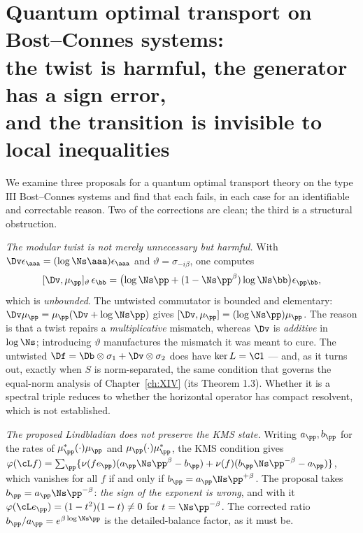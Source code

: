 \chapter[Twists, detailed balance, and tensorisation]{Quantum optimal transport on Bost--Connes systems:\\ the twist is harmful, the generator has a sign error,\\ and the transition is invisible to local inequalities}\label{ch:XVI}
\begin{summary}
We examine three proposals for a quantum optimal transport theory on the type $\mathrm{III}$
Bost--Connes systems and find that each fails, in each case for an identifiable and
correctable reason. Two of the corrections are clean; the third is a structural obstruction.

\emph{The modular twist is not merely unnecessary but harmful.} With
$\Dv\epsilon_\aaa=(\log\Ns\aaa)\epsilon_\aaa$ and $\vartheta=\sigma_{-i\beta}$, one computes
\[
[\Dv,\mu_\pp]_\vartheta\,\epsilon_\bb=\bigl(\log\Ns\pp+(1-\Ns\pp^{\beta})\log\Ns\bb\bigr)\epsilon_{\pp\bb},
\]
which is \emph{unbounded}. The untwisted commutator is bounded and elementary:
$\Dv\mu_\pp=\mu_\pp(\Dv+\log\Ns\pp)$ gives $[\Dv,\mu_\pp]=(\log\Ns\pp)\mu_\pp$. The reason is
that a twist repairs a \emph{multiplicative} mismatch, whereas $\Dv$ is \emph{additive} in
$\log\Ns$; introducing $\vartheta$ manufactures the mismatch it was meant to cure. The
untwisted $\Df=\Db\otimes\sigma_1+\Dv\otimes\sigma_2$ does have $\ker L=\C1$ --- and, as it
turns out, exactly when $S$ is norm-separated, the same condition that governs the
equal-norm analysis of Chapter~\ref{ch:XIV} (its Theorem 1.3). Whether it is a spectral
triple reduces to whether the horizontal operator has compact resolvent, which is not
established.

\emph{The proposed Lindbladian does not preserve the KMS state.} Writing $a_\pp,b_\pp$ for
the rates of $\mu_\pp^*(\cdot)\mu_\pp$ and $\mu_\pp(\cdot)\mu_\pp^*$, the KMS condition gives
$\varphi(\cL f)=\sum_\pp\{\nu(fe_\pp)(a_\pp\Ns\pp^{\beta}-b_\pp)+\nu(f)(b_\pp\Ns\pp^{-\beta}-a_\pp)\}$,
which vanishes for all $f$ if and only if $b_\pp=a_\pp\Ns\pp^{+\beta}$. The proposal takes
$b_\pp=a_\pp\Ns\pp^{-\beta}$: \emph{the sign of the exponent is wrong}, and with it
$\varphi(\cL e_\pp)=(1-t^2)(1-t)\ne0$ for $t=\Ns\pp^{-\beta}$. The corrected ratio
$b_\pp/a_\pp=e^{\beta\log\Ns\pp}$ is the detailed-balance factor, as it must be.


\end{summary}

